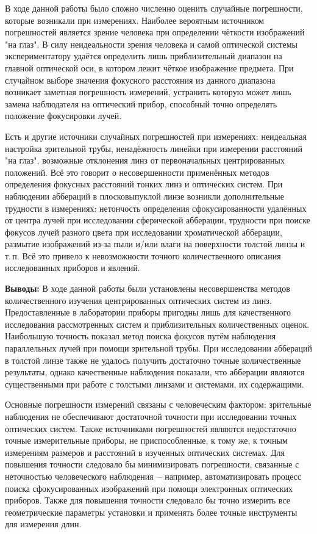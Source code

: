 \documentclass[a4paper,12pt]{article} %
\begin{document}
В ходе данной работы было сложно численно оценить случайные погрешности, которые возникали при измерениях. Наиболее вероятным источником погрешностей является зрение человека при определении чёткости изображений "на глаз". В силу неидеальности зрения человека и самой оптической системы экспериментатору удаётся определить лишь приблизительный диапазон на главной оптической оси, в котором лежит чёткое изображение предмета. При случайном выборе значения фокусного расстояния из данного диапазона возникает заметная погрешность измерений, устранить которую может лишь замена наблюдателя на оптический прибор, способный точно определять положение фокусировки лучей.

Есть и другие источники случайных погрешностей при измерениях: неидеальная настройка зрительной трубы, ненадёжность линейки при измерении расстояний "на глаз", возможные отклонения линз от первоначальных центрированных положений. Всё это говорит о несовершенности применённых методов определения фокусных расстояний тонких линз и оптических систем. При наблюдении аббераций в плосковыпуклой линзе возникли дополнительные трудности в измерениях: нетончость определения сфокусированности удалённых от центра лучей при исследовании сферической абберации, трудности при поиске фокусов лучей разного цвета при исследовании хроматической абберации, размытие изображений из-за пыли и/или влаги на поверхности толстой линзы и т.\,п. Всё это привело к невозможности точного количественного описания исследованных приборов и явлений.

\textbf{Выводы:} В ходе данной работы были установлены несовершенства методов количественного изучения центрированных оптических систем из линз. Предоставленные в лаборатории приборы пригодны лишь для качественного исследования рассмотренных систем и приблизительных количественных оценок. Наибольшую точность показал метод поиска фокусов путём наблюдения параллельных лучей при помощи зрительной трубы. При исследовании аббераций в толстой линзе также не удалось получить достаточно точные количественные результаты, однако качественные наблюдения показали, что абберации являются существенными при работе с толстыми линзами и системами, их содержащими. 

Основные погрешности измерений связаны с человеческим фактором: зрительные наблюдения не обеспечивают достаточной точности при исследовании точных оптических систем. Также источниками погрешностей являются недостаточно точные измерительные приборы, не приспособленные, к тому же, к точным измерениям размеров и расстояний в изученных оптических системах. Для повышения точности следовало бы минимизировать погрешности, связанные с неточностью человеческого наблюдения~-- например, автоматизировать процесс поиска сфокусированных изображений при помощи электронных оптических приборов. Также для повышения точности следовало бы точно измерить все геометрические параметры установки и применять более точные инструменты для измерения длин.
\end{document}
